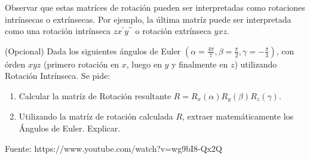 \documentclass[tp]{lcc}
\begin{document}
    \begin{figure}[!h]
    \centering
    \hspace{-4cm}
    \hspace{3cm}
    \subfloat[$R_{y}(\SI{90}{\degree})$]
    {
        
    }
    \hspace{3cm}
    \hspace{3cm}
    \end{figure}
    
    Observar que estas matríces de rotación pueden ser interpretadas como rotaciones intrínsecas o extrínsecas. Por ejemplo, la última matríz puede ser interpretada como una rotación intrínseca $zx^{\prime}y^{\prime\prime}$ o rotación extrínseca $yxz$.
    
\ejercicio (Opcional) Dada los siguientes ángulos de Euler $(\alpha = \frac{4\pi}{7}, \beta = \frac{\pi}{2}, \gamma = -\frac{\pi}{3})$, con órden $xyz$ (primero rotación en $x$, luego en $y$ y finalmente en $z$) utilizando Rotación Intrínseca. Se pide:

\begin{enumerate}
    \item Calcular la matríz de Rotación resultante $R = R_{x}(\alpha) R_{y}(\beta) R_{z}(\gamma)$.
    \item Utilizando la matríz de rotación calculada $R$, extraer matemáticamente los Ángulos de Euler. Explicar.
\end{enumerate}

\begin{solucion}
    Fuente: https://www.youtube.com/watch?v=wg9bI8-Qx2Q
\end{solucion}
\end{document}
